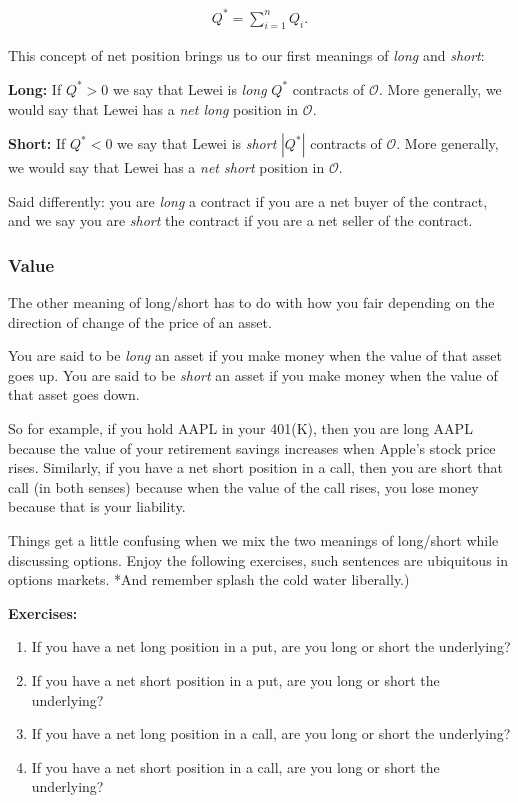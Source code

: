 \documentclass[11pt,]{krantz}
\begin{document}
\begin{align*}
Q^{*} = \sum_{i=1}^{n} Q_{i}.
\end{align*}

This concept of net position brings us to our first meanings of \emph{long} and \emph{short}:

\textbf{Long:} If \(Q^{*}>0\) we say that Lewei is \emph{long} \(Q^{*}\) contracts of \(\mathcal{O}\). More generally, we would say that Lewei has a \emph{net long} position in \(\mathcal{O}\).

\textbf{Short:} If \(Q^{*}<0\) we say that Lewei is \emph{short} \(|Q^{*}|\) contracts of \(\mathcal{O}\). More generally, we would say that Lewei has a \emph{net short} position in \(\mathcal{O}\).

Said differently: you are \emph{long} a contract if you are a net buyer of the contract, and we say you are \emph{short} the contract if you are a net seller of the contract.

\subsubsection*{Value}\label{value}

The other meaning of long/short has to do with how you fair depending on the direction of change of the price of an asset.

You are said to be \emph{long} an asset if you make money when the value of that asset goes up. You are said to be \emph{short} an asset if you make money when the value of that asset goes down.

So for example, if you hold AAPL in your 401(K), then you are long AAPL because the value of your retirement savings increases when Apple's stock price rises. Similarly, if you have a net short position in a call, then you are short that call (in both senses) because when the value of the call rises, you lose money because that is your liability.

Things get a little confusing when we mix the two meanings of long/short while discussing options. Enjoy the following exercises, such sentences are ubiquitous in options markets. *And remember splash the cold water liberally.)

\textbf{Exercises:}

\begin{enumerate}
\def\labelenumi{\arabic{enumi}.}
\item
  If you have a net long position in a put, are you long or short the underlying?
\item
  If you have a net short position in a put, are you long or short the underlying?
\item
  If you have a net long position in a call, are you long or short the underlying?
\item
  If you have a net short position in a call, are you long or short the underlying?
\end{enumerate}
\end{document}
